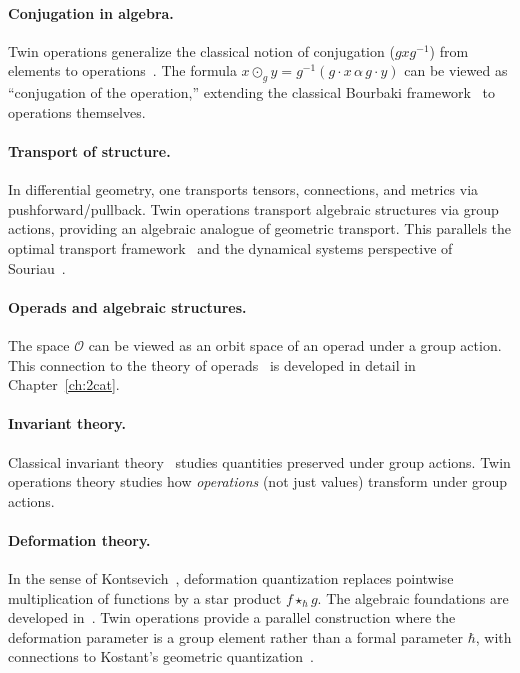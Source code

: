 \documentclass[11pt,a4paper,openany]{book}
\theoremstyle{plain}
\theoremstyle{definition}
\newcommand{\twing}[1]{\odot_{#1}}
\newcommand{\opspace}{\mathcal{O}}
\begin{document}
\paragraph{Conjugation in algebra.} Twin operations generalize the classical notion of conjugation ($gxg^{-1}$) from elements to operations~\cite{artin2011, lang2002}. The formula $x \twing{g} y = g^{-1}(g \cdot x \,\alpha\, g \cdot y)$ can be viewed as ``conjugation of the operation,'' extending the classical Bourbaki framework~\cite{bourbaki1989} to operations themselves.

\paragraph{Transport of structure.} In differential geometry, one transports tensors, connections, and metrics via pushforward/pullback. Twin operations transport algebraic structures via group actions, providing an algebraic analogue of geometric transport. This parallels the optimal transport framework~\cite{villani2009} and the dynamical systems perspective of Souriau~\cite{souriau1970}.

\paragraph{Operads and algebraic structures.} The space $\opspace$ can be viewed as an orbit space of an operad under a group action. This connection to the theory of operads~\cite{leinster2004, loday1998} is developed in detail in Chapter~\ref{ch:2cat}.

\paragraph{Invariant theory.} Classical invariant theory~\cite{serre1977} studies quantities preserved under group actions. Twin operations theory studies how \emph{operations} (not just values) transform under group actions.

\paragraph{Deformation theory.} In the sense of Kontsevich~\cite{kontsevich2003}, deformation quantization replaces pointwise multiplication of functions by a star product $f \star_\hbar g$. The algebraic foundations are developed in~\cite{chari-pressley1994, kassel1995}. Twin operations provide a parallel construction where the deformation parameter is a group element rather than a formal parameter $\hbar$, with connections to Kostant's geometric quantization~\cite{kostant1970}.
\end{document}
